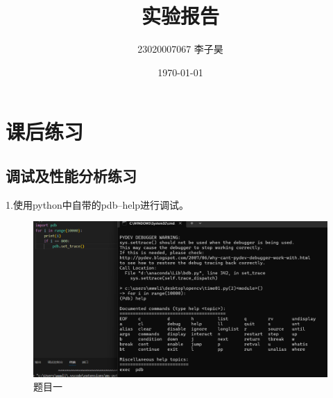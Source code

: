 \documentclass[a4paper, 12pt]{article}
\title{实验报告}
\author{23020007067 李子昊}
\date{\today}
\begin{document}
\maketitle

\large \tableofcontents
\newpage
{}
 
 \section{课后练习}
\subsection{调试及性能分析练习}
\noindent 1.使用python中自带的pdb--help进行调试。
\begin{figure}[H]
  \centering
  \includegraphics[width=\textwidth]{屏幕截图 2024-09-15 153834.png}
  \caption{题目一}
\end{figure}
\end{document}
